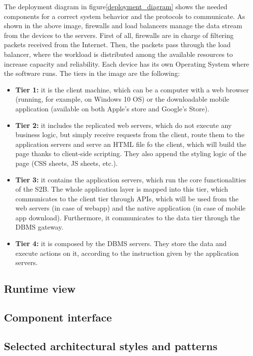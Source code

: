 The deployment diagram in figure\ref{deployment_diagram} shows the needed components for a correct system behavior and the protocols to communicate. As shown in the above image, firewalls and load balancers manage the data stream
from the devices to the servers. First of all, firewalls are in charge of filtering packets
received from the Internet. Then, the packets pass through the load balancer, where
the workload is distributed among the available resources to increase capacity and
reliability.
Each device has its own Operating System where the software runs.
The tiers in the image are the following:
\begin{itemize}
    \item \textbf{Tier 1:} it is the client machine, which can be a computer with a web browser (running, for example, on Windows 10 OS) or the downloadable mobile application (available on both Apple's store and Google's Store).
    \item \textbf{Tier 2:} it includes the replicated web servers, which do not execute any business logic, but simply receive requests from the client, route them to the application servers and serve an HTML file fo the client, which will build the page thanks to client-side scripting. They also append the styling logic of the page (CSS sheets, JS sheets, etc.).
    \item \textbf{Tier 3:} it contains the application servers, which run the core functionalities of the S2B. The whole application layer is mapped into this tier, which communicates to the client tier through APIs, which will be used from the web servers (in case of webapp) and the native application (in case of mobile app download). Furthermore, it communicates to the data tier through the DBMS gateway.
    \item \textbf{Tier 4:} it is composed by the DBMS servers. They store the data and execute actions on it, according to the instruction given by the application servers.
\end{itemize}
\subsection{Runtime view}
\subsection{Component interface}
\subsection{Selected architectural styles and patterns}

